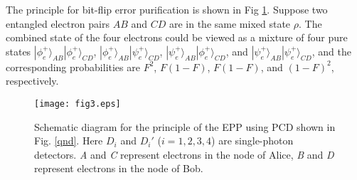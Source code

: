 \documentclass[aps,graphicx,twocolumn]{revtex4}%
\begin{document}

The principle for bit-flip error purification is shown in Fig \ref{pro}. Suppose two entangled electron pairs $AB$ and $CD$ are in the same mixed state $\rho$. The combined state of the four electrons could be viewed as a mixture of four pure states $|\phi^{+}_e\rangle_{AB}|\phi^{+}_e\rangle_{CD}$, $|\phi^{+}_e\rangle_{AB}|\psi^{+}_e\rangle_{CD}$, $|\psi^{+}_e\rangle_{AB}|\phi^{+}_e\rangle_{CD}$, and $|\psi^{+}_e\rangle_{AB}|\psi^{+}_e\rangle_{CD}$, and the corresponding probabilities are $F^{2}$, $F(1-F)$, $F(1-F)$, and $(1-F)^{2}$, respectively.

\begin{figure}[!tpb]
  \centering
  \texttt{[image: fig3.eps]}\\
  \caption{Schematic diagram for the principle of the EPP using PCD shown in Fig. \ref{qnd}. Here $D_i$ and $D_i'$ ($i=1,2,3,4$) are single-photon detectors. \emph{A} and \emph{C} represent electrons  in the node of Alice, \emph{B} and \emph{D} represent electrons   in the node of Bob.}\label{pro}
\end{figure}
\end{document}
